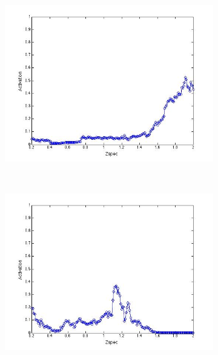 \documentclass[useAMS,usenatbib,fleqn]{mn2e}
\begin{document}
\begin{figure}
\begin{subfigure}[b]{0.075\textwidth}
                \includegraphics[trim = 35px 15px 50px 25px, clip=true,width=\textwidth]{figures/activation_03.jpg}
        \end{subfigure}
        ~
        \begin{subfigure}[b]{0.075\textwidth}
                \includegraphics[trim = 35px 15px 50px 25px, clip=true,width=\textwidth]{figures/activation_04.jpg}
        \end{subfigure}
        ~
        \begin{subfigure}[b]{0.075\textwidth}

\end{subfigure}
\end{figure}
\end{document}
